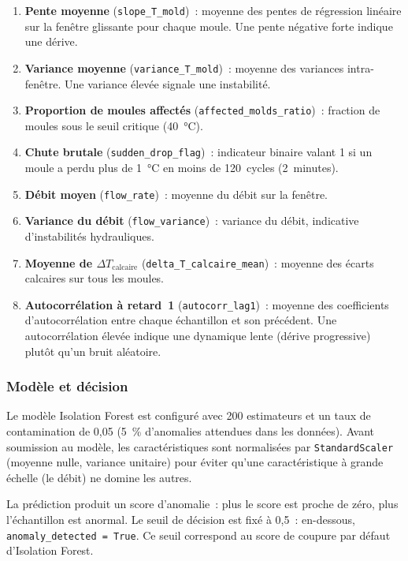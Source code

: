 \begin{enumerate}
  \item \textbf{Pente moyenne} (\texttt{slope\_T\_mold})~: moyenne des pentes de régression linéaire sur la fenêtre glissante pour chaque moule. Une pente négative forte indique une dérive.
  \item \textbf{Variance moyenne} (\texttt{variance\_T\_mold})~: moyenne des variances intra-fenêtre. Une variance élevée signale une instabilité.
  \item \textbf{Proportion de moules affectés} (\texttt{affected\_molds\_ratio})~: fraction de moules sous le seuil critique (40~\si{\celsius}).
  \item \textbf{Chute brutale} (\texttt{sudden\_drop\_flag})~: indicateur binaire valant 1 si un moule a perdu plus de 1~\si{\celsius} en moins de 120~cycles (2~minutes).
  \item \textbf{Débit moyen} (\texttt{flow\_rate})~: moyenne du débit sur la fenêtre.
  \item \textbf{Variance du débit} (\texttt{flow\_variance})~: variance du débit, indicative d'instabilités hydrauliques.
  \item \textbf{Moyenne de \(\Delta T_{\text{calcaire}}\)} (\texttt{delta\_T\_calcaire\_mean})~: moyenne des écarts calcaires sur tous les moules.
  \item \textbf{Autocorrélation à retard~1} (\texttt{autocorr\_lag1})~: moyenne des coefficients d'autocorrélation entre chaque échantillon et son précédent. Une autocorrélation élevée indique une dynamique lente (dérive progressive) plutôt qu'un bruit aléatoire.
\end{enumerate}

\subsubsection{Modèle et décision}

Le modèle Isolation Forest est configuré avec 200 estimateurs et un taux de contamination de 0,05 (5~\% d'anomalies attendues dans les données). Avant soumission au modèle, les caractéristiques sont normalisées par \texttt{StandardScaler} (moyenne nulle, variance unitaire) pour éviter qu'une caractéristique à grande échelle (le débit) ne domine les autres.

La prédiction produit un score d'anomalie~: plus le score est proche de zéro, plus l'échantillon est anormal. Le seuil de décision est fixé à 0,5~: en-dessous, \texttt{anomaly\_detected = True}. Ce seuil correspond au score de coupure par défaut d'Isolation Forest.

